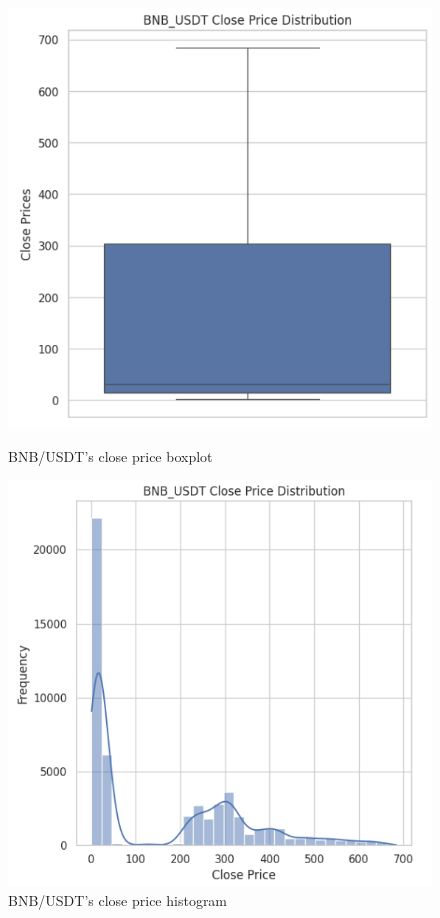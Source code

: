 \documentclass{ieeeojies}
\begin{document}
\begin{figure}[H]
    \centering
    \begin{minipage}{0.23\textwidth}
    \centering
    \includegraphics[width=1\textwidth]{bibliography/BNB_box.png}
    \caption{BNB/USDT's close price boxplot}
    \label{fig:enter-label}
    \end{minipage}
    \hfill
    \begin{minipage}{0.23\textwidth}
    \centering
    \includegraphics[width=1\textwidth]{bibliography/BNB_hist.png}
    \caption{BNB/USDT's close price histogram}
    \label{fig:enter-label}
    \end{minipage}
\end{figure}
\end{document}
